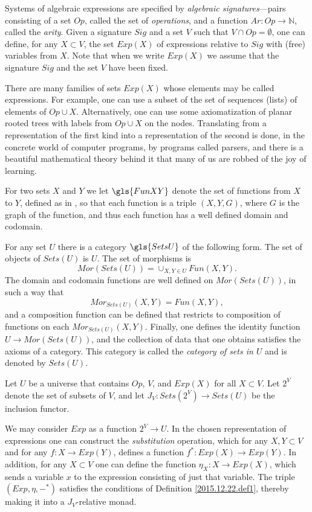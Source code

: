 \documentclass[onecolumn,12pt]{amsart}
\numberwithin{proposition}{subsection}
\newcommand{\sr}{\rightarrow}
\newcommand{\nn}{{\mathbb N}}
\newcommand{\nat}{\nn}
\newcommand{\mbind}[1]{{#1^*}}
\begin{document}
Systems of algebraic expressions are specified by {\em algebraic signatures}---pairs
consisting of a set $Op$, called the set of {\em operations}, and a function
$Ar:Op\sr \nat$, called the {\em arity}.  Given a signature $Sig$ and a set $V$ such that
$V\cap Op=\emptyset$, one can define, for any $X\subset V$, the set $Exp(X)$ of
expressions relative to $Sig$ with (free) variables from $X$. Note that when we
write $Exp(X)$ we assume that the signature $Sig$ and the set $V$ have been
fixed.

There are many families of sets $Exp(X)$ whose elements may be called
expressions. For example, one can use a subset of the set of sequences (lists)
of elements of $Op\cup X$. Alternatively, one can use some axiomatization of
planar rooted trees with labels from $Op\cup X$ on the nodes.
Translating from a representation of the first kind into a representation of
the second is done, in the concrete world of computer programs, by programs
called parsers, and there is a beautiful mathematical theory behind it that
many of us are robbed of the joy of learning.

For two sets $X$ and $Y$ we let $\gls{FunXY}$ denote the set of functions from $X$
to $Y$, defined as in \cite[p.~81]{Bourbaki.Sets}, so that each function is a
triple $(X,Y,G)$, where $G$ is the graph of the function, and thus each
function has a well defined domain and codomain.

For any set $U$ there is a category $\gls{SetsU}$ of the following form. The set of
objects of $Sets(U)$ is $U$. The set of morphisms is
%
$$Mor(Sets(U))=\cup_{X,Y\in U}Fun(X,Y).$$
%
The domain and codomain functions are well
defined on $Mor(Sets(U))$, in such a way that
%
$$Mor_{Sets(U)}(X,Y)=Fun(X,Y),$$
%
and a composition function can be defined that restricts to composition of
functions on each $Mor_{Sets(U)}(X,Y)$. Finally, one defines the identity function
$U\sr Mor(Sets(U))$, and the collection of data that one obtains
satisfies the axioms of a category.  This category is called the {\em category of
sets in $U$} and is denoted by $Sets(U)$.

Let $U$ be a universe that contains $Op$, $V$, and $Exp(X)$ for all $X\subset V$.
Let $2^V$ denote the set of subsets of $V$, and let
$J_V:Sets(2^V)\sr Sets(U)$ be the inclusion functor.

We may consider $Exp$ as a function $2^V\sr U$. In the chosen representation of
expressions one can construct the {\em substitution} operation, which for any
$X,Y\subset V$ and for any $f:X\sr Exp(Y)$, defines a function $\mbind{f}:Exp(X)\sr Exp(Y)$.
In addition, for any $X\subset V$ one can define the function
$\eta_{X}:X\sr Exp(X)$, which sends a variable $x$ to the expression consisting of
just that variable.
The triple $(Exp,\eta,\mbind{-})$ satisfies the
conditions of Definition \ref{2015.12.22.def1}, thereby making it into a $J_V$-relative
monad.
\end{document}
